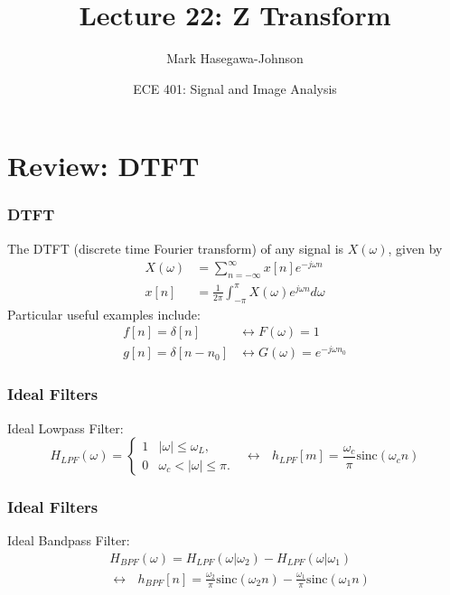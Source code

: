 \documentclass{beamer}
\title{Lecture 22: Z Transform}
\author{Mark Hasegawa-Johnson}
\date{ECE 401: Signal and Image Analysis}
\begin{document}
\begin{frame}
  \maketitle
\end{frame}

\begin{frame}
  \tableofcontents
\end{frame}

\section[DTFT]{Review: DTFT}
\setcounter{subsection}{1}

\begin{frame}
  \frametitle{DTFT}

  The DTFT (discrete time Fourier transform) of any signal is
  $X(\omega)$, given by
  \begin{align*}
    X(\omega) &= \sum_{n=-\infty}^\infty x[n]e^{-j\omega n}\\
    x[n] &= \frac{1}{2\pi}\int_{-\pi}^\pi X(\omega)e^{j\omega n}d\omega
  \end{align*}
  Particular useful examples include:
  \begin{align*}
    f[n]=\delta[n] &\leftrightarrow F(\omega)=1\\
    g[n]=\delta[n-n_0] &\leftrightarrow G(\omega)=e^{-j\omega n_0}
  \end{align*}
\end{frame}

\begin{frame}
  \frametitle{Ideal Filters}
  Ideal Lowpass Filter:
  \[
  H_{LPF}(\omega)
  = \begin{cases} 1& |\omega|\le\omega_L,\\
    0 & \omega_c<|\omega|\le\pi.
  \end{cases}~~~\leftrightarrow~~~
  h_{LPF}[m]=\frac{\omega_c}{\pi}\mbox{sinc}(\omega_c n)
  \]
\end{frame}

\begin{frame}
  \frametitle{Ideal Filters}
  Ideal Bandpass Filter:
  \begin{align*}
    &H_{BPF}(\omega)=H_{LPF}(\omega|\omega_2)-H_{LPF}(\omega|\omega_1)\\
    &\leftrightarrow~~~ h_{BPF}[n]=\frac{\omega_2}{\pi}\mbox{sinc}(\omega_2 n)-
    \frac{\omega_1}{\pi}\mbox{sinc}(\omega_1 n)
  \end{align*}
\end{frame}
\end{document}
